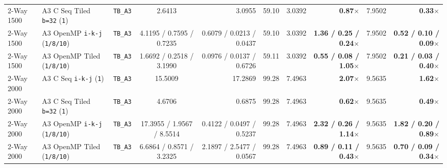 \documentclass[11pt,a4paper]{article}
\begin{document}
\begin{table}[!htbp]
{\begin{tabular}{lllcrrrrrr}
2-Way 1500 & A3 C Seq Tiled \texttt{b=32} (\texttt{1}) & \texttt{TB\_A3} & 2.6413 & 3.0955 & 59.10 & 3.0392 & \textbf{0.87$\times$} & 7.9502 & \textbf{0.33$\times$} \\
2-Way 1500 & A3 OpenMP \texttt{i-k-j} (\texttt{1/8/10}) & \texttt{TB\_A3} & 4.1195 / 0.7595 / 0.7235 & 0.6079 / 0.0213 / 0.0437 & 59.10 & 3.0392 & \textbf{1.36 / 0.25 / 0.24$\times$} & 7.9502 & \textbf{0.52 / 0.10 / 0.09$\times$} \\
2-Way 1500 & A3 OpenMP Tiled (\texttt{1/8/10}) & \texttt{TB\_A3} & 1.6692 / 0.2518 / 3.1990 & 0.0976 / 0.0137 / 0.6726 & 59.11 & 3.0392 & \textbf{0.55 / 0.08 / 1.05$\times$} & 7.9502 & \textbf{0.21 / 0.03 / 0.40$\times$} \\
\midrule
2-Way 2000 & A3 C Seq \texttt{i-k-j} (\texttt{1}) & \texttt{TB\_A3} & 15.5009 & 17.2869 & 99.28 & 7.4963 & \textbf{2.07$\times$} & 9.5635 & \textbf{1.62$\times$} \\
2-Way 2000 & A3 C Seq Tiled \texttt{b=32} (\texttt{1}) & \texttt{TB\_A3} & 4.6706 & 0.6875 & 99.28 & 7.4963 & \textbf{0.62$\times$} & 9.5635 & \textbf{0.49$\times$} \\
2-Way 2000 & A3 OpenMP \texttt{i-k-j} (\texttt{1/8/10}) & \texttt{TB\_A3} & 17.3955 / 1.9567 / 8.5514 & 0.4122 / 0.0497 / 0.5237 & 99.28 & 7.4963 & \textbf{2.32 / 0.26 / 1.14$\times$} & 9.5635 & \textbf{1.82 / 0.20 / 0.89$\times$} \\
2-Way 2000 & A3 OpenMP Tiled (\texttt{1/8/10}) & \texttt{TB\_A3} & 6.6864 / 0.8571 / 3.2325 & 2.1897 / 2.5477 / 0.0567 & 99.28 & 7.4963 & \textbf{0.89 / 0.11 / 0.43$\times$} & 9.5635 & \textbf{0.70 / 0.09 / 0.34$\times$} \\
\bottomrule
\end{tabular}%
}
\vspace{0.5ex}
\end{table}
\end{document}
